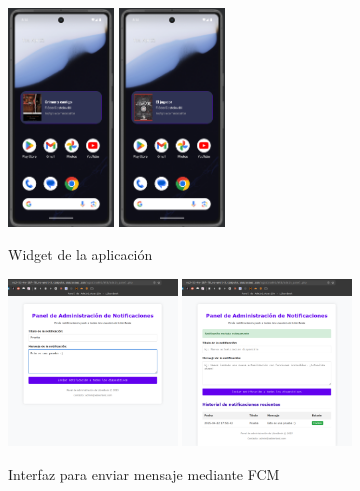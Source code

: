 \documentclass[a4paper,11pt]{report}
\begin{document}
      \begin{figure}[H]
        \centering
        \includegraphics[width=0.25\textwidth]{.img/widget.png}
        \hspace{2cm}
        \includegraphics[width=0.25\textwidth]{.img/widget_2.png}
        \caption{Widget de la aplicación}
        \label{fig:widget}
      \end{figure}
      \begin{figure}[H]
        \centering
        \includegraphics[width=0.4\textwidth]{.img/mensaje_no_enviado.png}
        \hspace{2cm}
        \includegraphics[width=0.4\textwidth]{.img/mensaje_enviado.png}
        \caption{Interfaz para enviar mensaje mediante FCM}
        \label{fig:mensaje}
      \end{figure}
\end{document}
